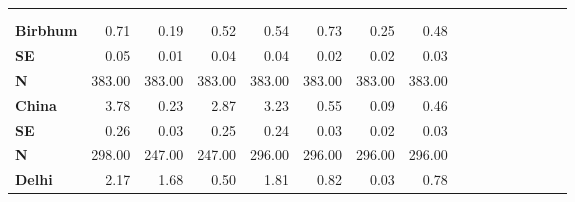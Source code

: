 \begin{tabular}{@{\extracolsep{5pt}}lrrrrrrrrrrrrrrr}
\toprule
&  &  &  &  &  &  &  \\
{\bf } &  &  &  &  &  &  &  \\
\hline
{\bf Birbhum} & 0.71\phantom{***} & 0.19\phantom{***} & 0.52\phantom{***} & 0.54\phantom{***} & 0.73\phantom{***} & 0.25\phantom{***} & 0.48\phantom{***} \\
{\bf SE} & 0.05\phantom{***} & 0.01\phantom{***} & 0.04\phantom{***} & 0.04\phantom{***} & 0.02\phantom{***} & 0.02\phantom{***} & 0.03\phantom{***} \\
{\bf N} & 383.00\phantom{***} & 383.00\phantom{***} & 383.00\phantom{***} & 383.00\phantom{***} & 383.00\phantom{***} & 383.00\phantom{***} & 383.00\phantom{***} \\
{\bf China} & 3.78\phantom{***} & 0.23\phantom{***} & 2.87\phantom{***} & 3.23\phantom{***} & 0.55\phantom{***} & 0.09\phantom{***} & 0.46\phantom{***} \\
{\bf SE} & 0.26\phantom{***} & 0.03\phantom{***} & 0.25\phantom{***} & 0.24\phantom{***} & 0.03\phantom{***} & 0.02\phantom{***} & 0.03\phantom{***} \\
{\bf N} & 298.00\phantom{***} & 247.00\phantom{***} & 247.00\phantom{***} & 296.00\phantom{***} & 296.00\phantom{***} & 296.00\phantom{***} & 296.00\phantom{***} \\
{\bf Delhi} & 2.17\phantom{***} & 1.68\phantom{***} & 0.50\phantom{***} & 1.81\phantom{***} & 0.82\phantom{***} & 0.03\phantom{***} & 0.78\phantom{***} \\

\end{tabular}
